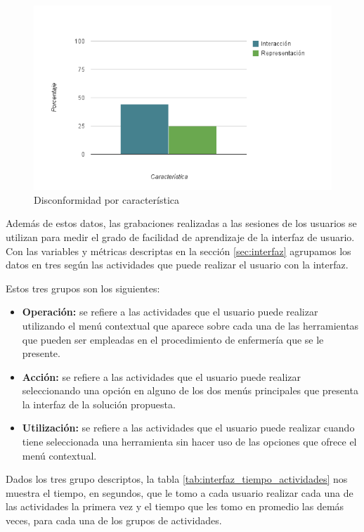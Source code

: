 \begin{figure}[ht!]
\centering
\includegraphics[scale=0.8]{resultados/imagenes/interfaz_disconformidad_caracteristica.png}
\caption{Disconformidad por característica}
\label{fig:interfaz_disconformidad_caracteristica}
\end{figure}



Además de estos datos, las grabaciones realizadas a las sesiones de los usuarios se utilizan para medir el grado de facilidad de aprendizaje de la interfaz de usuario. Con las variables y métricas descriptas en la sección \ref{sec:interfaz} agrupamos los datos
en tres según las actividades que puede realizar el usuario con la interfaz.

Estos tres grupos son los siguientes: 

\begin{itemize}
\item \textbf{Operación:} se refiere a las actividades que el usuario puede realizar utilizando el menú contextual que aparece sobre cada una de las herramientas que pueden ser empleadas en el procedimiento de enfermería que se le presente.
\item \textbf{Acción:} se refiere a las actividades que el usuario puede realizar seleccionando una opción en alguno de los dos menús principales que presenta la interfaz de la solución propuesta.
\item \textbf{Utilización:} se refiere a las actividades que el usuario puede realizar cuando tiene seleccionada una herramienta sin hacer uso de las opciones que ofrece el menú contextual.
\end{itemize}

Dados los tres grupo descriptos, la tabla \ref{tab:interfaz_tiempo_actividades} nos muestra el tiempo, en segundos, que le tomo a cada usuario realizar cada una de las actividades la primera vez y el tiempo que les tomo en promedio las demás veces, para cada una de los grupos de actividades.

